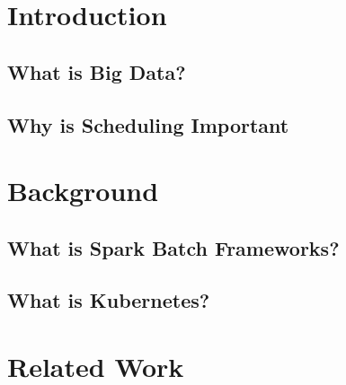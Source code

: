 



\newcommand{\titleLineOne}{Detection of Higher-Level Concepts}
\newcommand{\titleLineTwo}{ in Highly-Linked Big Data}
\newcommand{\titleLineThree}{}
\newcommand{\documentdate}{December 22, 2015}
\newcommand{\studentname}{Max Mustermann}
\newcommand{\abstracttextde}{Kurze Zusammenfassung der Arbeit in 250 W\"ortern.}
\newcommand{\abstracttext}{Short version of the thesis in 250 words.}
\newcommand{\acktext}{This chapter is optional. First of all, I would like to...}
\providecommand{\tightlist}{%
  \setlength{\itemsep}{0pt}\setlength{\parskip}{0pt}}


 




\chapter{Introduction}

\section{What is Big Data?}

\section{Why is Scheduling Important}


\chapter{Background}

\section{What is Spark Batch Frameworks?}

\section{What is Kubernetes?}


\chapter{Related Work}

